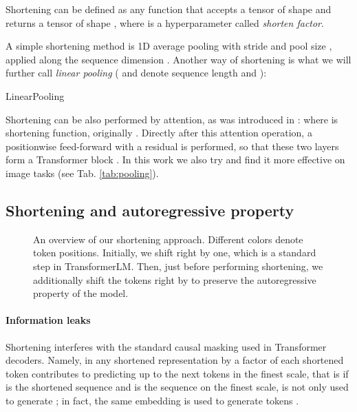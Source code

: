 \documentclass[11pt]{article}
\newcommand{\shf}{\emph{shorten factor}}
\begin{document}
Shortening can be defined as any function  that accepts a tensor  of shape  and returns a tensor  of shape , where  is a hyperparameter called \shf. 
    
A simple shortening method is 1D average pooling with stride  and pool size , applied along the sequence dimension .
Another way of shortening is what we will further call \emph{linear pooling} ( and  denote sequence length and ):
\begin{algorithm}[H]
\begin{algorithmic}
\STATE 
\STATE 
\end{algorithmic}
\caption{LinearPooling}
\end{algorithm}

Shortening can be also performed by attention, as was introduced in \cite{dai2020funneltransformer}:  where  is shortening function, originally . Directly after this attention operation, a positionwise feed-forward with a residual is performed, so that these two layers form a Transformer block \cite{vaswani2017attention}. In this work we also try  and find it more effective on image tasks (see Tab. \ref{tab:pooling}).

\subsection{Shortening and autoregressive property}\label{sec:lm}

\begin{figure}
\centering
\centering
\caption{An overview of our shortening approach. Different colors denote token positions. Initially, we shift right by one, which is a standard step in TransformerLM. Then, just before performing shortening, we additionally shift the tokens right by  to preserve the autoregressive property of the model.}
\label{fig:shortening}
\end{figure}


\paragraph{Information leaks}
Shortening interferes with the standard causal masking used in Transformer decoders. 
Namely, in any shortened representation by a factor of 
each shortened token contributes to predicting up to the next  tokens in the finest scale, 
that is if  is the shortened sequence and  is the sequence on the finest scale, 
 is not only used to generate ; in fact, the same embedding is used to generate tokens .
\end{document}

